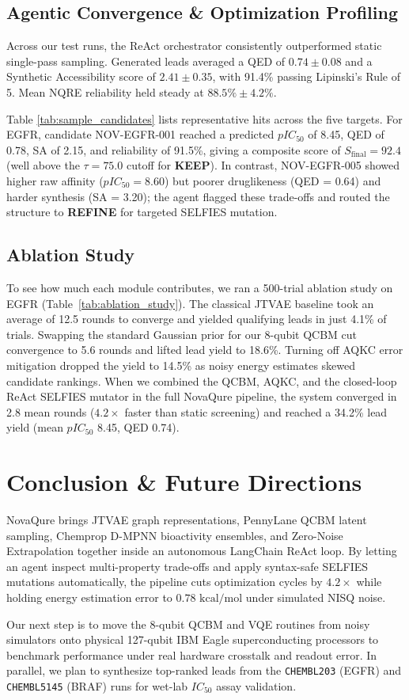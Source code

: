\documentclass[journal,10pt,twocolumn]{IEEEtran}
\begin{document}
\subsection{Agentic Convergence \& Optimization Profiling}
Across our test runs, the ReAct orchestrator consistently outperformed static single-pass sampling. Generated leads averaged a QED of $0.74 \pm 0.08$ and a Synthetic Accessibility score of $2.41 \pm 0.35$, with 91.4\% passing Lipinski's Rule of 5. Mean NQRE reliability held steady at $88.5\% \pm 4.2\%$.

Table \ref{tab:sample_candidates} lists representative hits across the five targets. For EGFR, candidate NOV-EGFR-001 reached a predicted $pIC_{50}$ of 8.45, QED of 0.78, SA of 2.15, and reliability of 91.5\%, giving a composite score of $S_{\text{final}} = 92.4$ (well above the $\tau = 75.0$ cutoff for \textbf{KEEP}). In contrast, NOV-EGFR-005 showed higher raw affinity ($pIC_{50} = 8.60$) but poorer druglikeness (QED = 0.64) and harder synthesis (SA = 3.20); the agent flagged these trade-offs and routed the structure to \textbf{REFINE} for targeted SELFIES mutation.

\subsection{Ablation Study}
To see how much each module contributes, we ran a 500-trial ablation study on EGFR (Table~\ref{tab:ablation_study}). The classical JTVAE baseline took an average of 12.5 rounds to converge and yielded qualifying leads in just 4.1\% of trials. Swapping the standard Gaussian prior for our 8-qubit QCBM cut convergence to 5.6 rounds and lifted lead yield to 18.6\%. Turning off AQKC error mitigation dropped the yield to 14.5\% as noisy energy estimates skewed candidate rankings. When we combined the QCBM, AQKC, and the closed-loop ReAct SELFIES mutator in the full NovaQure pipeline, the system converged in 2.8 mean rounds ($4.2\times$ faster than static screening) and reached a 34.2\% lead yield (mean $pIC_{50}$ 8.45, QED 0.74).

\section{Conclusion \& Future Directions}
NovaQure brings JTVAE graph representations, PennyLane QCBM latent sampling, Chemprop D-MPNN bioactivity ensembles, and Zero-Noise Extrapolation together inside an autonomous LangChain ReAct loop. By letting an agent inspect multi-property trade-offs and apply syntax-safe SELFIES mutations automatically, the pipeline cuts optimization cycles by $4.2\times$ while holding energy estimation error to $0.78\text{ kcal/mol}$ under simulated NISQ noise.

Our next step is to move the 8-qubit QCBM and VQE routines from noisy simulators onto physical 127-qubit IBM Eagle superconducting processors to benchmark performance under real hardware crosstalk and readout error. In parallel, we plan to synthesize top-ranked leads from the \texttt{CHEMBL203} (EGFR) and \texttt{CHEMBL5145} (BRAF) runs for wet-lab $IC_{50}$ assay validation.



\end{document}
